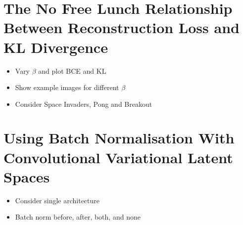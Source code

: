 %
%
%
%
%
\section{The No Free Lunch Relationship Between Reconstruction Loss and KL Divergence}

\begin{itemize}
\item Vary $\beta$ and plot BCE and KL
\item Show example images for different $\beta$
\item Consider Space Invaders, Pong and Breakout
\end{itemize}

%
%
%
%
%
\section{Using Batch Normalisation With Convolutional Variational Latent Spaces}

\begin{itemize}
\item Consider single architecture 
\item Batch norm before, after, both, and none
\end{itemize}